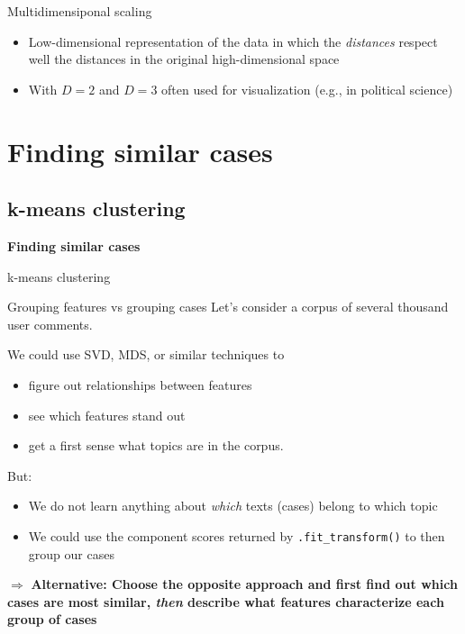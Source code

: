 \documentclass{beamer}
\begin{document}
\begin{frame}{Multidimensiponal scaling}
\begin{itemize}
	\item Low-dimensional representation of the data in which the \textit{distances} respect well the distances in the original high-dimensional space
	\item With $D=2$ and $D=3$ often used for visualization (e.g., in political science)
\end{itemize}
\end{frame}









\section{Finding similar cases}

\subsection{k-means clustering}

\begin{frame}[plain]
\textbf{Finding similar cases}

k-means clustering
\end{frame}




\begin{frame}{Grouping features vs grouping cases}
Let's consider a corpus of several thousand user comments.

We could use SVD, MDS, or similar techniques to 
\begin{itemize}
	\item figure out relationships between features
	\item see which features stand out
	\item get a first sense what topics are in the corpus.
\end{itemize}
\pause

But:
\begin{itemize}
	\item<+-> We do not learn anything about \emph{which} texts (cases) belong to which topic
	\item<+-> We could use the component scores returned by \texttt{.fit\_transform()} to then group our cases
\end{itemize}

\pause 
$\Rightarrow$ \textbf{Alternative: Choose the opposite approach and first find out which cases are most similar, \textit{then} describe what features characterize each group of cases}


\end{frame}
\end{document}
